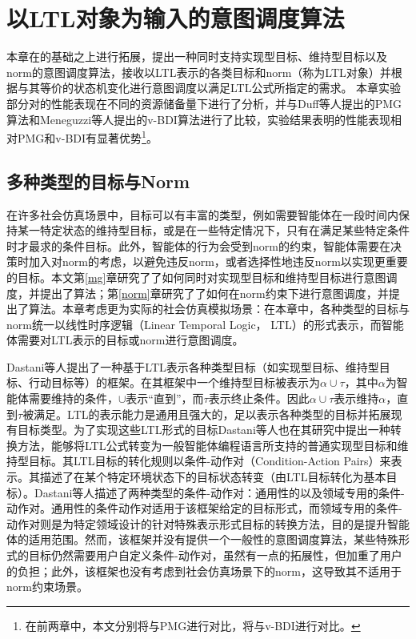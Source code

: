 \chapter{以LTL对象为输入的意图调度算法}\label{ltl}
本章在\SA 的基础之上进行拓展，提出一种同时支持实现型目标、维持型目标以及norm的意图调度算法\SAT ，\SAT 接收以LTL表示的各类目标和norm（称为LTL对象）并根据与其等价的状态机变化进行意图调度以满足LTL公式所指定的需求。 本章实验部分对\SAT 的性能表现在不同的资源储备量下进行了分析，并与Duff等人提出的PMG\cite{DBLP:conf/atal/DuffHT06}算法和Meneguzzi等人提出的v-BDI算法\cite{DBLP:journals/eaai/MeneguzziROVL15}进行了比较，实验结果表明\SAT 的性能表现相对PMG和v-BDI有显著优势\footnote{在前两章中，本文分别将\SAM 与PMG进行对比，将\SAN 与v-BDI进行对比。}。
\section{多种类型的目标与Norm}
在许多社会仿真场景中，目标可以有丰富的类型，例如需要智能体在一段时间内保持某一特定状态的维持型目标，或是在一些特定情况下，只有在满足某些特定条件时才最求的条件目标。此外，智能体的行为会受到norm的约束，智能体需要在决策时加入对norm的考虑，以避免违反norm，或者选择性地违反norm以实现更重要的目标。本文第\ref{mg}章研究了了如何同时对实现型目标和维持型目标进行意图调度，并提出了\SAM 算法；第\ref{norm}章研究了了如何在norm约束下进行意图调度，并提出了\SAN 算法。本章考虑更为实际的社会仿真模拟场景：在本章中，各种类型的目标与norm统一以线性时序逻辑（Linear Temporal Logic， LTL）的形式表示，而智能体需要对LTL表示的目标或norm进行意图调度。

Dastani等人\cite{DBLP:conf/atal/DastaniRW11}提出了一种基于LTL表示各种类型目标（如实现型目标、维持型目标、行动目标等）的框架。在其框架中一个维持型目标被表示为$\alpha \cup \tau$，其中$\alpha$为智能体需要维持的条件，$\cup$表示“直到”，而$\tau$表示终止条件。因此$\alpha \cup \tau$表示维持$\alpha$，直到$\tau$被满足。LTL的表示能力是通用且强大的，足以表示各种类型的目标并拓展现有目标类型。为了实现这些LTL形式的目标Dastani等人也在其研究中提出一种转换方法，能够将LTL公式转变为一般智能体编程语言所支持的普通实现型目标和维持型目标。其LTL目标的转化规则以条件-动作对（Condition-Action Pairs）来表示。其描述了在某个特定环境状态下的目标状态转变（由LTL目标转化为基本目标）。Dastani等人\cite{DBLP:conf/atal/DastaniRW11}描述了两种类型的条件-动作对：通用性的以及领域专用的条件-动作对。通用性的条件动作对适用于该框架给定的目标形式，而领域专用的条件-动作对则是为特定领域设计的针对特殊表示形式目标的转换方法，目的是提升智能体的适用范围。然而，该框架并没有提供一个一般性的意图调度算法，某些特殊形式的目标仍然需要用户自定义条件-动作对，虽然有一点的拓展性，但加重了用户的负担；此外，该框架也没有考虑到社会仿真场景下的norm，这导致其不适用于norm约束场景。

